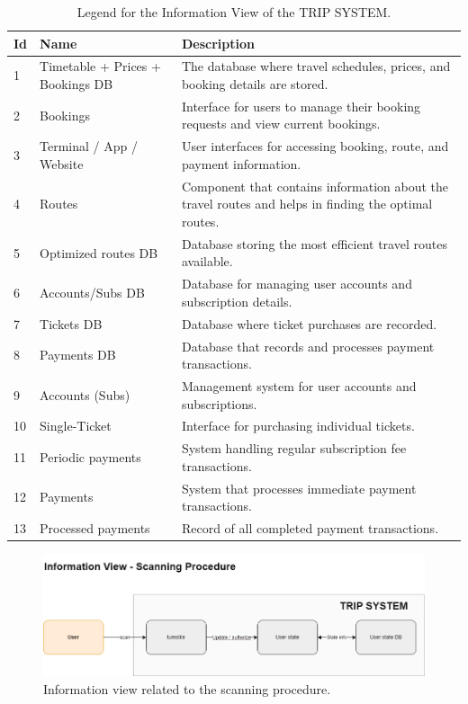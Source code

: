 \begin{table}[H]
    \centering
    \caption{Legend for the Information View of the TRIP SYSTEM.}
    \label{tab:information_view_legend}
    \begin{tabular}{@{}llp{10cm}@{}}
    \toprule
    \textbf{Id} & \textbf{Name} & \textbf{Description} \\
    \midrule
    1 & Timetable + Prices + Bookings DB & The database where travel schedules, prices, and booking details are stored. \\
    2 & Bookings & Interface for users to manage their booking requests and view current bookings. \\
    3 & Terminal / App / Website & User interfaces for accessing booking, route, and payment information. \\
    4 & Routes & Component that contains information about the travel routes and helps in finding the optimal routes. \\
    5 & Optimized routes DB & Database storing the most efficient travel routes available. \\
    6 & Accounts/Subs DB & Database for managing user accounts and subscription details. \\
    7 & Tickets DB & Database where ticket purchases are recorded. \\
    8 & Payments DB & Database that records and processes payment transactions. \\
    9 & Accounts (Subs) & Management system for user accounts and subscriptions. \\
    10 & Single-Ticket & Interface for purchasing individual tickets. \\
    11 & Periodic payments & System handling regular subscription fee transactions. \\
    12 & Payments & System that processes immediate payment transactions. \\
    13 & Processed payments & Record of all completed payment transactions. \\
    \bottomrule
\end{tabular}
\end{table}

\begin{figure}[H]
    \centering
    \includegraphics[width=\textwidth]{drawings/views_final_version/information_view scanning.png}
    \caption{Information view related to the scanning procedure.}
    \label{fig:information_view_scanning}
\end{figure}

